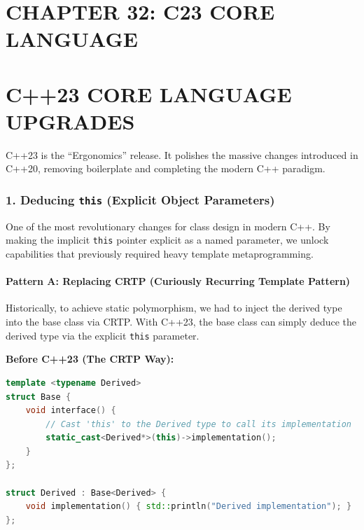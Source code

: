 \hypertarget{chapter-32-c23-core-language}{%
\section{CHAPTER 32: C23 CORE
LANGUAGE}\label{chapter-32-c23-core-language}}

\hypertarget{c23-core-language-upgrades}{%
\section{C++23 CORE LANGUAGE
UPGRADES}\label{c23-core-language-upgrades}}

C++23 is the ``Ergonomics'' release. It polishes the massive changes
introduced in C++20, removing boilerplate and completing the modern C++
paradigm.

\hypertarget{deducing-this-explicit-object-parameters}{%
\subsubsection{\texorpdfstring{1. Deducing \texttt{this} (Explicit
Object
Parameters)}{1. Deducing this (Explicit Object Parameters)}}\label{deducing-this-explicit-object-parameters}}

One of the most revolutionary changes for class design in modern C++. By
making the implicit \passthrough{\lstinline!this!} pointer explicit as a
named parameter, we unlock capabilities that previously required heavy
template metaprogramming.

\hypertarget{pattern-a-replacing-crtp-curiously-recurring-template-pattern}{%
\paragraph{Pattern A: Replacing CRTP (Curiously Recurring Template
Pattern)}\label{pattern-a-replacing-crtp-curiously-recurring-template-pattern}}

Historically, to achieve static polymorphism, we had to inject the
derived type into the base class via CRTP. With C++23, the base class
can simply deduce the derived type via the explicit
\passthrough{\lstinline!this!} parameter.

\textbf{Before C++23 (The CRTP Way):}

\begin{lstlisting}[language={C++}]
template <typename Derived>
struct Base {
    void interface() {
        // Cast 'this' to the Derived type to call its implementation
        static_cast<Derived*>(this)->implementation();
    }
};

struct Derived : Base<Derived> {
    void implementation() { std::println("Derived implementation"); }
};
\end{lstlisting}

